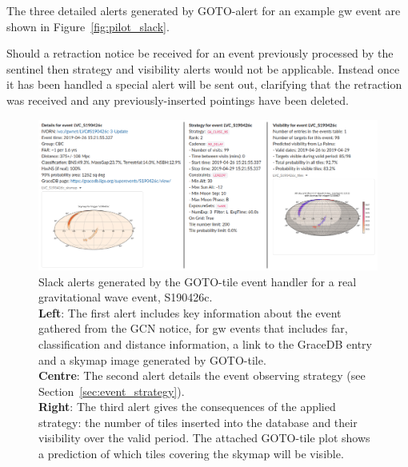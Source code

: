 \begin{colsection}
\begin{colsection}
The three detailed alerts generated by GOTO-alert for an example \gls{gw} event are shown in Figure~\ref{fig:pilot_slack}.

Should a retraction notice be received for an event previously processed by the sentinel then strategy and visibility alerts would not be applicable. Instead once it has been handled a special alert will be sent out, clarifying that the retraction was received and any previously-inserted pointings have been deleted.

\begin{figure}
\begin{center}
\includegraphics[width=\linewidth]{images/gototile_slack_side.png}
\end{center}
\caption[Slack alerts created by GOTO-tile for a GW event]{Slack alerts generated by the GOTO-tile event handler for a real gravitational wave event, S190426c.\\
\textbf{Left}: The first alert includes key information about the event gathered from the GCN notice, for \gls{gw} events that includes \gls{far}, classification and distance information, a link to the GraceDB entry and a skymap image generated by GOTO-tile.\\
\textbf{Centre}: The second alert details the event observing strategy (see Section~\ref{sec:event_strategy}).\\
\textbf{Right}: The third alert gives the consequences of the applied strategy: the number of tiles inserted into the database and their visibility over the valid period. The attached GOTO-tile plot shows a prediction of which tiles covering the skymap will be visible.
}
\label{fig:gototile_slack}
\end{figure}

\end{colsection}


\newpage


\end{colsection}
